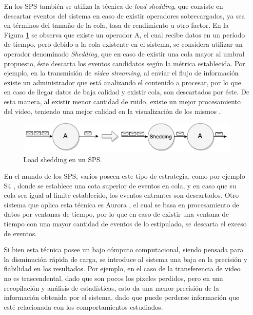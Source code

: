 En los SPS también se utiliza la técnica de \textit{load shedding}, que consiste en descartar eventos del sistema en caso de existir operadores sobrecargados, ya sea \normalsize{en términos del} tamaño de la cola, tasa de rendimiento u otro factor. En la Figura \ref{fig:loadShedding} se observa que existe un operador A, el cual recibe datos en un período de tiempo, pero debido a la cola existente en el sistema, se considera utilizar un operador denominado \textit{Shedding}, que en caso de existir una cola mayor al umbral propuesto, éste descarta los eventos candidatos según la métrica establecida. Por ejemplo, en la transmisión de \textit{video streaming}, al enviar el flujo de información existe un administrador que está analizando el contenido a procesar, por lo que en caso de llegar datos de baja calidad y existir cola, son descartados por éste. De esta manera, al existir menor cantidad de ruido, existe un mejor procesamiento del video, teniendo una mejor calidad en la visualización de los mismos \citep{SheuC09}. 

\begin{figure}[!ht]
	\centering
	\includegraphics[scale=0.6]{images/LoadShedding.pdf}
	\caption{Load shedding en un SPS.}
	\label{fig:loadShedding}
\end{figure}

En el mundo de los SPS, varios poseen este tipo de estrategia, como por ejemplo S4 \citep{s4}, donde se establece una cota superior de eventos en cola, y en caso que su cola sea igual al límite establecido, los eventos entrantes son descartados. Otro sistema que aplica esta técnica es Aurora \citep{aurora}, el cual se basa en procesamiento de datos por ventanas de tiempo, por lo que en caso de existir una ventana de tiempo con una mayor cantidad de eventos de lo estipulado, se descarta el exceso de eventos.

Si bien esta técnica \normalsize{posee un bajo cómputo computacional}, siendo pensada para la disminución rápida de carga, se introduce al sistema una baja en la precisión y fiabilidad en los resultados. Por ejemplo, en el caso de la transferencia de video no es trascendental, dado que son pocos los pixeles perdidos, pero en una recopilación y análisis de estadísticas, esto da una menor precisión de la información obtenida por el sistema, dado que puede perderse información que esté relacionada con los comportamientos estudiados.


